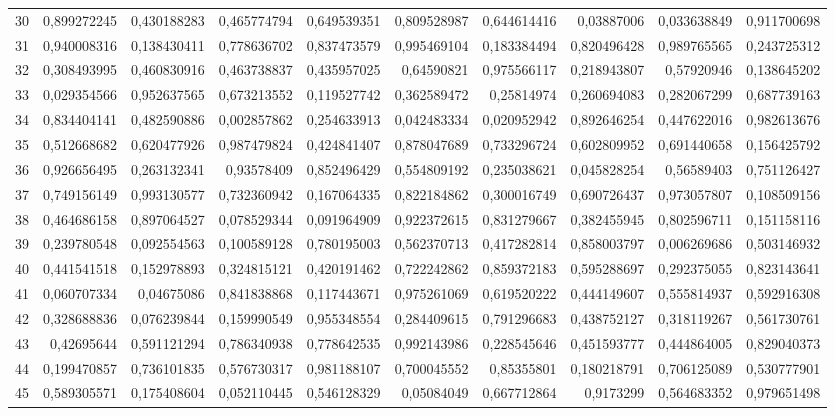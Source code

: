 \documentclass{article}
\begin{document}
\begin{landscape}
\begin{longtable}{lrrrrrrrrr}
30	&	0,899272245	&	0,430188283	&	0,465774794	&	0,649539351	&	0,809528987	&	0,644614416	&	0,03887006	&	0,033638849	&	0,911700698	\\
31	&	0,940008316	&	0,138430411	&	0,778636702	&	0,837473579	&	0,995469104	&	0,183384494	&	0,820496428	&	0,989765565	&	0,243725312	\\
32	&	0,308493995	&	0,460830916	&	0,463738837	&	0,435957025	&	0,64590821	&	0,975566117	&	0,218943807	&	0,57920946	&	0,138645202	\\
33	&	0,029354566	&	0,952637565	&	0,673213552	&	0,119527742	&	0,362589472	&	0,25814974	&	0,260694083	&	0,282067299	&	0,687739163	\\
34	&	0,834404141	&	0,482590886	&	0,002857862	&	0,254633913	&	0,042483334	&	0,020952942	&	0,892646254	&	0,447622016	&	0,982613676	\\
35	&	0,512668682	&	0,620477926	&	0,987479824	&	0,424841407	&	0,878047689	&	0,733296724	&	0,602809952	&	0,691440658	&	0,156425792	\\
36	&	0,926656495	&	0,263132341	&	0,93578409	&	0,852496429	&	0,554809192	&	0,235038621	&	0,045828254	&	0,56589403	&	0,751126427	\\
37	&	0,749156149	&	0,993130577	&	0,732360942	&	0,167064335	&	0,822184862	&	0,300016749	&	0,690726437	&	0,973057807	&	0,108509156	\\
38	&	0,464686158	&	0,897064527	&	0,078529344	&	0,091964909	&	0,922372615	&	0,831279667	&	0,382455945	&	0,802596711	&	0,151158116	\\
39	&	0,239780548	&	0,092554563	&	0,100589128	&	0,780195003	&	0,562370713	&	0,417282814	&	0,858003797	&	0,006269686	&	0,503146932	\\
40	&	0,441541518	&	0,152978893	&	0,324815121	&	0,420191462	&	0,722242862	&	0,859372183	&	0,595288697	&	0,292375055	&	0,823143641	\\
41	&	0,060707334	&	0,04675086	&	0,841838868	&	0,117443671	&	0,975261069	&	0,619520222	&	0,444149607	&	0,555814937	&	0,592916308	\\
42	&	0,328688836	&	0,076239844	&	0,159990549	&	0,955348554	&	0,284409615	&	0,791296683	&	0,438752127	&	0,318119267	&	0,561730761	\\
43	&	0,42695644	&	0,591121294	&	0,786340938	&	0,778642535	&	0,992143986	&	0,228545646	&	0,451593777	&	0,444864005	&	0,829040373	\\
44	&	0,199470857	&	0,736101835	&	0,576730317	&	0,981188107	&	0,700045552	&	0,85355801	&	0,180218791	&	0,706125089	&	0,530777901	\\
45	&	0,589305571	&	0,175408604	&	0,052110445	&	0,546128329	&	0,05084049	&	0,667712864	&	0,9173299	&	0,564683352	&	0,979651498	\\

\end{longtable}
\end{landscape}
\end{document}
